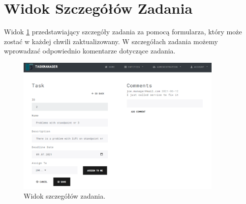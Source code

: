 \section{Widok Szczegółów Zadania}
Widok \ref{taskcomm} przedstawiający szczegóły zadania za pomocą formularza, który może zostać w każdej chwili zaktualizowany. W szczegółach zadania możemy wprowadzać odpowiednio komentarze dotyczące zadania. 
\begin{figure}[h!]
	\centering
	\includegraphics[width=0.90\textwidth]{taskcomm}
	
	\caption{Widok szczegółów zadania.}
	\label{taskcomm}
\end{figure}
